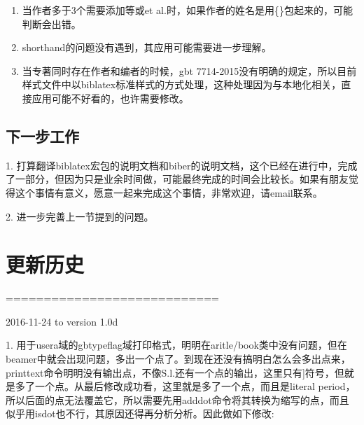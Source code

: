 \begin{enumerate}
  \item 当作者多于3个需要添加等或et al.时，如果作者的姓名是用\{\}包起来的，可能判断会出错。



  \item shorthand的问题没有遇到，其应用可能需要进一步理解。


  \item 当专著同时存在作者和编者的时候，gbt 7714-2015没有明确的规定，所以目前样式文件中以biblatex标准样式的方式处理，这种处理因为与本地化相关，直接应用可能不好看的，也许需要修改。
\end{enumerate}

\subsection{下一步工作}

1. 打算翻译biblatex宏包的说明文档和biber的说明文档，这个已经在进行中，完成了一部分，但因为只是业余时间做，可能最终完成的时间会比较长。如果有朋友觉得这个事情有意义，愿意一起来完成这个事情，非常欢迎，请email联系。

2. 进一步完善上一节提到的问题。


\section{更新历史}
============================

2016-11-24 to version 1.0d

1. 用于usera域的gbtypeflag域打印格式，明明在aritle/book类中没有问题，但在beamer中就会出现问题，多出一个点了。到现在还没有搞明白怎么会多出点来，printtext命令明明没有输出点，不像S.l.还有一个点的输出，这里只有]符号，但就是多了一个点。从最后修改成功看，这里就是多了一个点，而且是literal period，所以后面的点无法覆盖它，所以需要先用adddot命令将其转换为缩写的点，而且似乎用isdot也不行，其原因还得再分析分析。因此做如下修改:

